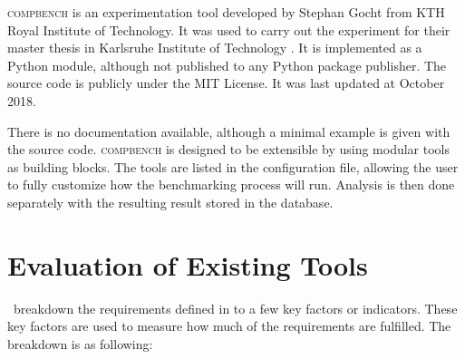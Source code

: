 \textsc{compbench} \citep{gochtPythonFrameworkRunning2018} is an experimentation tool developed by Stephan Gocht from KTH Royal Institute of Technology.
It was used to carry out the experiment for their master thesis in Karlsruhe Institute of Technology \citep{gochtIncrementalSATSolving}.
It is implemented as a Python module, although not published to any Python package publisher.
The source code is publicly under the MIT License.
It was last updated at October 2018.

There is no documentation available, although a minimal example is given with the source code.
\textsc{compbench} is designed to be extensible by using modular tools as building blocks.
The tools are listed in the configuration file, allowing the user to fully customize how the benchmarking process will run.
Analysis is then done separately with the resulting result stored in the database.


\section{Evaluation of Existing Tools}
\label{sec:existing.eval}

\First~breakdown the requirements defined in  to a few key factors or indicators.
These key factors are used to measure how much of the requirements are fulfilled.
The breakdown is as following:

